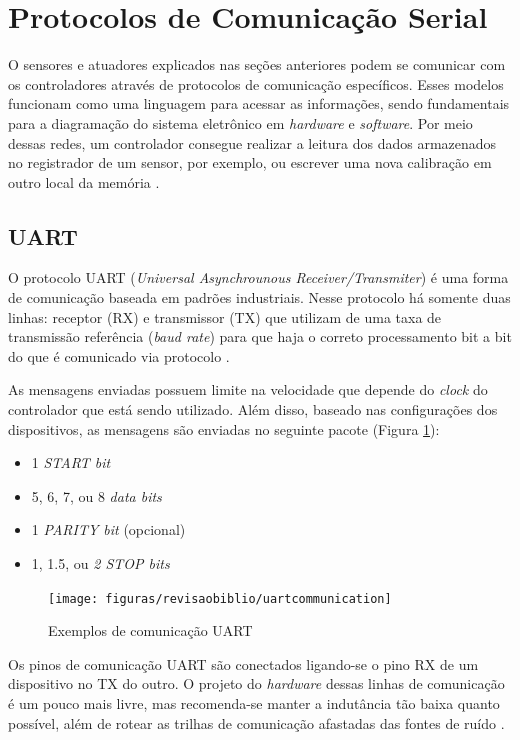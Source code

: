 \section{Protocolos de Comunicação Serial}

O sensores e atuadores explicados nas seções anteriores podem se comunicar com os controladores através de protocolos de comunicação específicos. Esses modelos funcionam como uma linguagem para acessar as informações, sendo fundamentais para a diagramação do sistema eletrônico em \textit{hardware} e \textit{software}. Por meio dessas redes, um controlador consegue realizar a leitura dos dados armazenados no registrador de um sensor, por exemplo, ou escrever uma nova calibração em outro local da memória \cite{man:texasI2C}.

\subsection{UART}
\label{sec:uart}
O protocolo UART (\textit{Universal Asynchrounous Receiver/Transmiter}) é uma forma de comunicação baseada em padrões industriais. Nesse protocolo há somente duas linhas: receptor (RX) e transmissor (TX) que utilizam de uma taxa de transmissão referência (\textit{baud rate}) para que haja o correto processamento bit a bit do que é comunicado via protocolo \cite{man:texasUART}. 

As mensagens enviadas possuem limite na velocidade que depende do \textit{clock} do controlador que está sendo utilizado. Além disso, baseado nas configurações dos dispositivos, as mensagens são enviadas no seguinte pacote (Figura \ref{fig:uartcommunication}):

\begin{itemize}
	\item 1 \textit{START bit}
	\item 5, 6, 7, ou  8 \textit{data bits}
	\item 1 \textit{PARITY bit} (opcional)
	\item 1, 1.5, ou \textit{2 STOP bits}
\end{itemize}

\begin{figure}[!htb]
	\centering
	\caption{Exemplos de comunicação UART}
	\texttt{[image: figuras/revisaobiblio/uartcommunication]}
	\label{fig:uartcommunication}
\end{figure}

Os pinos de comunicação UART são conectados ligando-se o pino RX de um dispositivo no TX do outro. O projeto do \textit{hardware} dessas linhas de comunicação é um pouco mais livre, mas recomenda-se manter a indutância tão baixa quanto possível, além de rotear as trilhas de comunicação afastadas das fontes de ruído \cite{site:altiumpcb}.

